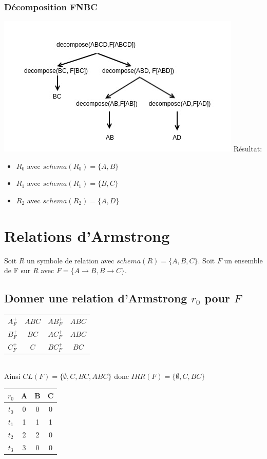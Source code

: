 \documentclass[10pt,a4paper,twoside]{article}
\begin{document}
\subsubsection{Décomposition FNBC}
\includegraphics[scale=0.75]{decompose2.jpg}
Résultat:
\begin{itemize}
\item $R_{0}$ avec $schema(R_{0})=\{A,B\}$
\item $R_{1}$ avec $schema(R_{1})=\{B,C\}$
\item $R_{2}$ avec $schema(R_{2})=\{A,D\}$
\end{itemize}

\section{Relations d'Armstrong}
Soit $R$ un symbole de relation avec $schema(R)=\{A,B,C\}$. Soit $F$ un ensemble de F sur $R$ avec $F=\{A\rightarrow B, B\rightarrow C\}$.
\subsection{Donner une relation d'Armstrong $r_{0}$ pour $F$}
\begin{tabular}{c|c||c|c}
$A^{+}_{F}$ & $ABC$ & $AB^{+}_{F}$ & $ABC$ \\ 
$B^{+}_{F}$ & $BC$ & $AC^{+}_{F}$ & $ABC$ \\ 
$C^{+}_{F}$ & $C$ & $BC^{+}_{F}$ & $BC$ \\ 
\end{tabular} \\

Ainsi $CL(F)=\{\emptyset,C,BC,ABC\}$ donc $IRR(F)=\{\emptyset,C,BC\}$\\

\begin{tabular}{c|ccc}
$r_{0}$ & A & B & C \\ 
\hline 
$t_{0}$ & 0 & 0 & 0 \\ 
$t_{1}$ & 1 & 1 & 1 \\ 
$t_{2}$ & 2 & 2 & 0 \\ 
$t_{3}$ & 3 & 0 & 0 \\ 
\end{tabular} 
\end{document}
